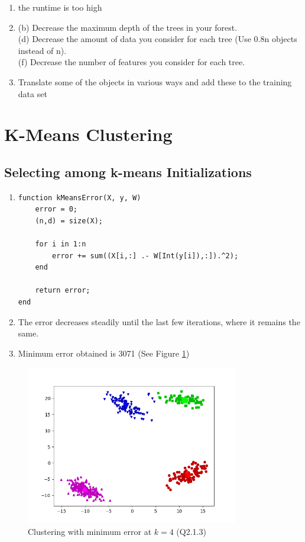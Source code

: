 \documentclass{article}
\begin{document}
\begin{enumerate}
\item the runtime is too high
\item
    (b) Decrease the maximum depth of the trees in your forest.\\
    (d) Decrease the amount of data you consider for each tree (Use 0.8n objects instead of n).\\
    (f) Decrease the number of features you consider for each tree.\\
\item Translate some of the objects in various ways and add these to the training data set
 
\end{enumerate}


\section{K-Means Clustering}

\subsection{Selecting among k-means Initializations}
 
\begin{enumerate}
 \item
\begin{verbatim}
function kMeansError(X, y, W)
    error = 0;
    (n,d) = size(X);

    for i in 1:n
        error += sum((X[i,:] .- W[Int(y[i]),:]).^2);
    end

    return error;
end
\end{verbatim}

 \item The error decreases steadily until the last few iterations, where it remains the same.
 \item Minimum error obtained is 3071 (See Figure \ref{fig:q2_1_3})
\end{enumerate}
\vspace{5em}

  \begin{figure}
    \includegraphics[width=25em]{a2_q2_1_3.png}
    \caption{Clustering with minimum error at $k=4$ (Q2.1.3)}
    \label{fig:q2_1_3}
 \end{figure}
\end{document}
